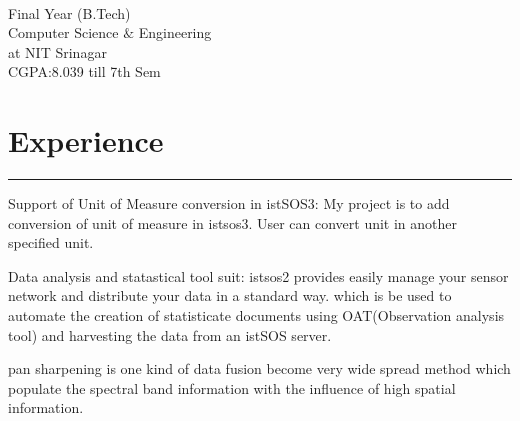 \documentclass[localFont,alternative,10pt,compact]{main}
\begin{document}
    \begin{minipage}[t]{0.66\textwidth}
        \begin{large}
            \\
        \end{large}
        Final Year (B.Tech)\\
        Computer Science $\&$  Engineering\\
        at NIT Srinagar \\
        CGPA:8.039 till 7th Sem




        \section{Experience}
        \noindent\rule{12.5cm}{0.4pt}
         
        \noindent
        \hspace{5em}%
        \begin{minipage}{0.85\textwidth\vspace{2pt}}
            Support of Unit of Measure conversion in istSOS3: My project is to add conversion of
            unit of measure in istsos3. User can convert unit in another specified unit.
        \end{minipage}
        \sectionsep

         
        \noindent
        \hspace{5em}%
        \begin{minipage}{0.85\textwidth\vspace{2pt}}
            Data analysis and statastical tool suit: istsos2 provides easily manage your sensor network
            and distribute your data in a standard way. which is be used to automate the creation of statisticate
            documents using OAT(Observation analysis tool) and harvesting the data from an istSOS server.
        \end{minipage}
        \sectionsep

         
        \noindent
        \hspace{5em}%
        \begin{minipage}{0.85\textwidth\vspace{2pt}}
            pan sharpening is one kind of data fusion become very wide spread method which populate the spectral band information with the influence of high spatial information.
        \end{minipage}
        \sectionsep


\end{minipage}
\end{document}

